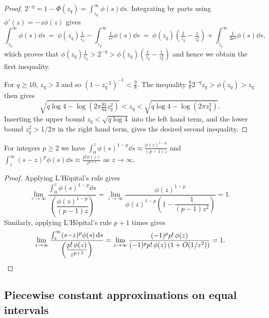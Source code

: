 \documentclass[manuscript,review]{acmart}
\begin{document}
\begin{proof}
  $ 2^{-q} = 1 - \Phi(z_q) = \int_{z_q}^{\infty} \phi(s) \dd{s} $.
  Integrating by parts using $ \phi'(z) =  -z \phi(z) $ gives
\[
\int_{z_q}^{\infty} \phi(s) \dd{s}
\ =\ \phi(z_q) \tfrac{1}{z_q} - \int_{z_q}^{\infty} \tfrac{1}{s^2} \phi(s) \dd{s}
\ =\ \phi(z_q) (\tfrac{1}{z_q} - \tfrac{1}{z^3_q}) + \int_{z_q}^{\infty} \tfrac{1}{4s^4} \phi(s) \dd{s},
\]
which proves that $\phi(z_q) \tfrac{1}{z_q} > 2^{-q} > \phi(z_q)(\tfrac{1}{z_q} - \tfrac{1}{z_q^3}) $ and hence we obtain the first inequality.

For $q \geq 10$, $z_q > 3$ and so $(1{-}z_q^{-2})^{-1} < \tfrac{9}{8}$. The inequality $\tfrac{9}{8} 2^{-q} z_q > \phi(z_q) > z_q$ then gives
\[
\sqrt{q \log 4 - \log (2\pi \tfrac{81}{64} z_q^2)} < z_q <
\sqrt{q \log 4 - \log (2\pi z_q^2)}.
\]
Inserting
the upper bound $z_q<\sqrt{q \log 4}$ into the left hand term, and
the lower bound $z_q^2 > 1/2\pi$ in the right hand term,
gives the desired second inequality.
\end{proof}

\begin{lemma}
\label{lemma:approximate_moments}
For integers $ p \geq 2 $ we have $ \int_{0}^{z} \phi(s)^{1-p} \dd{s} \approx \tfrac{\phi(z)^{1-p}}{(p-1)z}  $ and $ \int_{z}^{\infty} (s-z)^p\phi(s) \dd{s} \approx \tfrac{p!\phi(z)}{z^{p+1}} $ as $z\rightarrow\infty$.
\end{lemma}

\begin{proof}
Applying L'H\^{o}pital's rule gives
\begin{equation*}
\lim_{z \to \infty} \dfrac{\int_{0}^{z} \phi(s)^{1-p} \dd{s}}{\left(\dfrac{\phi(z)^{1-p}}{(p-1)z}\right)} 
=  \lim_{z \to \infty} \dfrac{\phi(z)^{1-p}}{\phi(z)^{1-p}\left(1 - \dfrac{1}{(p-1)z^2} \right)} 
= 1.
\end{equation*}
Similarly, applying L'H\^{o}pital's rule $p+1$ times gives
\[
\lim_{z \to \infty} \dfrac{\int_z^\infty (s{-}z)^p \phi(s) \dd{s}}{\left(\dfrac{p!\, \phi(z)}{z^{p+1}}\right)} 
=  \lim_{z \to \infty} \dfrac{(-1)^p p!\, \phi(z)}{(-1)^p p!\, \phi(z) \,(1 + O(1/z^2))}
= 1.\qedhere
\]
\end{proof}

\subsection{Piecewise constant approximations on equal intervals}
\label{sec:piecewise_constant_approximations_on_equal_intervals}
\end{document}
